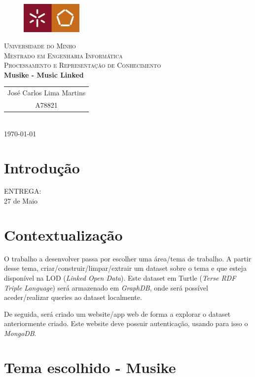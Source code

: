 \documentclass{article}
\begin{document}
{
\center
\begin{figure}[H]
        \centering
        \includegraphics[width=3cm]{Pictures/UM_EENG.jpg}
\end{figure}
\textsc{\Large Universidade do Minho} \\ [0.5cm]
\textsc{\Large Mestrado em Engenharia Informática} \\ [0.5cm]
\textsc{\large Processamento e Representação de Conhecimento} \\ [0.5cm]

{\LARGE \bfseries Musike - Music Linked} \\[0.5cm]

\begin{tabular}{c} 
    José Carlos Lima Martins \\
    A78821 \\
\end{tabular} \\[0.5cm]

\today \\[1cm]
}

\section{Introdução}

ENTREGA:\\
27 de Maio\\

\section{Contextualização}

O trabalho a desenvolver passa por escolher uma área/tema de trabalho. A partir desse tema, criar/construir/limpar/extrair um dataset sobre o tema e que esteja disponível na LOD (\textit{Linked Open Data}). Este dataset em Turtle (\textit{Terse RDF Triple Language}) será armazenado em \textit{GraphDB}, onde será possível aceder/realizar queries ao dataset localmente.

De seguida, será criado um website/app web de forma a explorar o dataset anteriormente criado. Este website deve possuir autenticação, usando para isso o \textit{MongoDB}.

\section{Tema escolhido - \textbf{Musike}}
\end{document}

